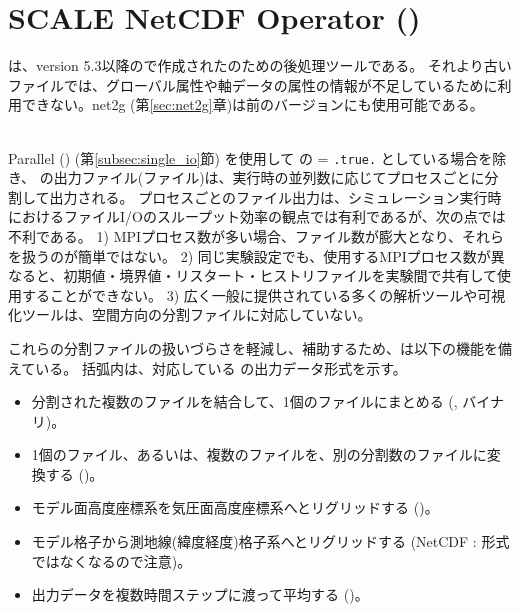\section{SCALE NetCDF Operator (\sno)} \label{sec:sno}

 \hrulefill

\sno は、version 5.3以降の\scalelib で作成された\scalenetcdf のための後処理ツールである。
それより古い \scalenetcdf ファイルでは、グローバル属性や軸データの属性の情報が不足しているために利用できない。net2g (第\ref{sec:net2g}章)は前のバージョンにも使用可能である。

\noindent \hrulefill\\


Parallel \netcdf (\pnetcdf) (第\ref{subsec:single_io}節) を使用して
 の  = \verb|.true.| としている場合を除き、
\scalerm の出力ファイル(\scalenetcdf ファイル)は、実行時の並列数に応じてプロセスごとに分割して出力される。
プロセスごとのファイル出力は、シミュレーション実行時におけるファイルI/Oのスループット効率の観点では有利であるが、次の点では不利である。
1) MPIプロセス数が多い場合、ファイル数が膨大となり、それらを扱うのが簡単ではない。
2) 同じ実験設定でも、使用するMPIプロセス数が異なると、初期値・境界値・リスタート・ヒストリファイルを実験間で共有して使用することができない。
3) 広く一般に提供されている多くの解析ツールや可視化ツールは、空間方向の分割ファイルに対応していない。

これらの分割ファイルの扱いづらさを軽減し、補助するため、\sno は以下の機能を備えている。
括弧内は、対応している \sno の出力データ形式を示す。
\begin{itemize}
 \item 分割された複数のファイルを結合して、1個のファイルにまとめる (\scalenetcdf, \grads バイナリ)。
 \item 1個のファイル、あるいは、複数のファイルを、別の分割数のファイルに変換する (\scalenetcdf)。
 \item モデル面高度座標系を気圧面高度座標系へとリグリッドする (\scalenetcdf)。
 \item モデル格子から測地線(緯度経度)格子系へとリグリッドする (NetCDF : \scalenetcdf 形式ではなくなるので注意)。
 \item 出力データを複数時間ステップに渡って平均する (\scalenetcdf)。
\end{itemize}


